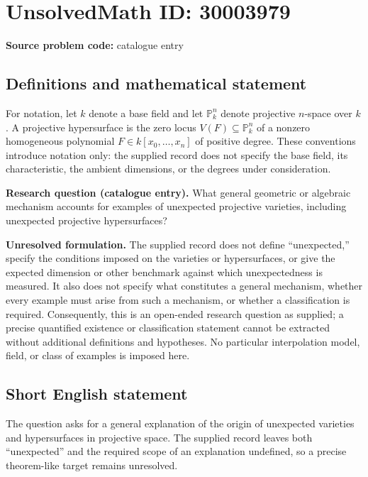 \documentclass[11pt]{article}
\newcommand{\PP}{\mathbb{P}}
\begin{document}
\section*{UnsolvedMath ID: 30003979}
\textbf{Source problem code:} catalogue entry
\subsection{Definitions and mathematical statement}
For notation, let \(k\) denote a base field and let \(\PP^n_k\) denote projective \(n\)-space over \(k\). A projective hypersurface is the zero locus \(V(F)\subseteq\PP^n_k\) of a nonzero homogeneous polynomial \(F\in k[x_0,\ldots,x_n]\) of positive degree. These conventions introduce notation only: the supplied record does not specify the base field, its characteristic, the ambient dimensions, or the degrees under consideration.

\textbf{Research question (catalogue entry).} What general geometric or algebraic mechanism accounts for examples of unexpected projective varieties, including unexpected projective hypersurfaces?

\textbf{Unresolved formulation.} The supplied record does not define ``unexpected,'' specify the conditions imposed on the varieties or hypersurfaces, or give the expected dimension or other benchmark against which unexpectedness is measured. It also does not specify what constitutes a general mechanism, whether every example must arise from such a mechanism, or whether a classification is required. Consequently, this is an open-ended research question as supplied; a precise quantified existence or classification statement cannot be extracted without additional definitions and hypotheses. No particular interpolation model, field, or class of examples is imposed here.
\subsection{Short English statement}
The question asks for a general explanation of the origin of unexpected varieties and hypersurfaces in projective space. The supplied record leaves both ``unexpected'' and the required scope of an explanation undefined, so a precise theorem-like target remains unresolved.
\end{document}
